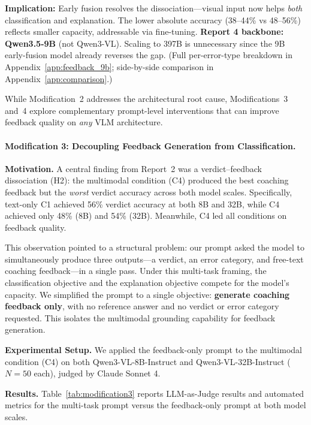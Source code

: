 \documentclass{article}
\begin{document}
\textbf{Implication:} Early fusion resolves the dissociation---visual input now
helps \emph{both} classification and explanation. The lower absolute accuracy
(38--44\% vs 48--56\%) reflects smaller capacity, addressable via fine-tuning.
\textbf{Report 4 backbone: Qwen3.5-9B} (not Qwen3-VL). Scaling to 397B is unnecessary
since the 9B early-fusion model already reverses the gap. (Full per-error-type
breakdown in Appendix~\ref{app:feedback_9b}; side-by-side comparison in
Appendix~\ref{app:comparison}.)

While Modification~2 addresses the architectural root cause, Modifications~3 and~4
explore complementary prompt-level interventions that can improve feedback quality
on \emph{any} VLM architecture.

\paragraph{Modification 3: Decoupling Feedback Generation from Classification.}

\textbf{Motivation.} A central finding from Report~2 was a verdict--feedback dissociation (H2): the multimodal condition (C4) produced the best coaching feedback but the \emph{worst} verdict accuracy across both model scales. Specifically, text-only C1 achieved 56\% verdict accuracy at both 8B and 32B, while C4 achieved only 48\% (8B) and 54\% (32B). Meanwhile, C4 led all conditions on feedback quality.

This observation pointed to a structural problem: our prompt asked the model to simultaneously produce three outputs---a verdict, an error category, and free-text coaching feedback---in a single pass. Under this multi-task framing, the classification objective and the explanation objective compete for the model's capacity. We simplified the prompt to a single objective: \textbf{generate coaching feedback only}, with no reference answer and no verdict or error category requested. This isolates the multimodal grounding capability for feedback generation.

\textbf{Experimental Setup.} We applied the feedback-only prompt to the multimodal condition (C4) on both Qwen3-VL-8B-Instruct and Qwen3-VL-32B-Instruct ($N{=}50$ each), judged by Claude Sonnet 4.

\textbf{Results.} Table~\ref{tab:modification3} reports LLM-as-Judge results and automated metrics for the multi-task prompt versus the feedback-only prompt at both model scales.
\end{document}
